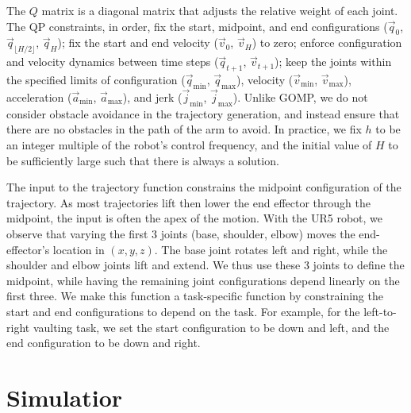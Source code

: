 The $Q$ matrix is a diagonal matrix that adjusts the relative weight of each joint.  The QP constraints, in order, fix the start, midpoint, and end configurations ($\vec{q}_0$, $\vec{q}_{\lfloor H/2 \rfloor}$, $\vec{q}_{H}$); fix the start and end velocity ($\vec{v}_0$, $\vec{v}_{H}$) to zero; enforce configuration and velocity dynamics between time steps ($\vec{q}_{t+1}$, $\vec{v}_{t+1}$); keep the joints within the specified limits of configuration ($\vec{q}_\mathrm{min}$, $\vec{q}_\mathrm{max}$), velocity ($\vec{v}_\mathrm{min}$, $\vec{v}_\mathrm{max}$), acceleration ($\vec{a}_\mathrm{min}$, $\vec{a}_\mathrm{max}$), and jerk ($\vec{j}_\mathrm{min}$, $\vec{j}_\mathrm{max}$).
Unlike GOMP, we do not consider obstacle avoidance in the trajectory generation, and instead ensure that there are no obstacles in the path of the arm to avoid.  In practice, we fix $h$ to be an integer multiple of the robot's control frequency, and the initial value of $H$ to be sufficiently large such that there is always a solution.

The input to the trajectory function constrains the midpoint configuration of the trajectory.  As most trajectories lift then lower the end effector through the midpoint, the input is often the apex of the motion.  With the UR5 robot, we observe that varying the first 3 joints (base, shoulder, elbow) moves the end-effector's location in $(x,y,z)$.  The base joint rotates left and right, while the shoulder and elbow joints lift and extend.  We thus use these 3 joints to define the midpoint, while having the remaining joint configurations depend linearly on the first three.
We make this function a task-specific function by constraining the start and end configurations to depend on the task.  For example, for the left-to-right vaulting task, we set the start configuration to be down and left, and the end configuration to be down and right.

\section{Simulatior}
\label{sec:sim2real}

